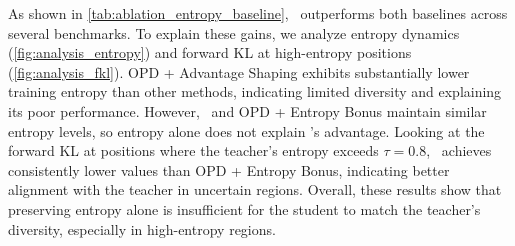 As shown in \autoref{tab:ablation_entropy_baseline}, \method~outperforms both baselines across several benchmarks.
To explain these gains, we analyze entropy dynamics (\autoref{fig:analysis_entropy}) and forward KL at high-entropy positions (\autoref{fig:analysis_fkl}).
OPD + Advantage Shaping exhibits substantially lower training entropy than other methods, indicating limited diversity and explaining its poor performance. However, \method~and OPD + Entropy Bonus maintain similar entropy levels, so entropy alone does not explain \method's advantage. Looking at the forward KL at positions where the teacher's entropy exceeds $\tau=0.8$, \method~achieves consistently lower values than OPD + Entropy Bonus, indicating better alignment with the teacher in uncertain regions. Overall, these results show that preserving entropy alone is insufficient for the student to match the teacher’s diversity, especially in high-entropy regions.



